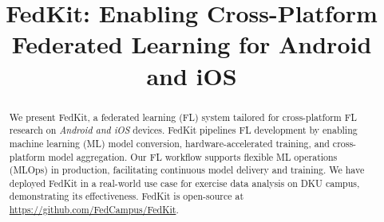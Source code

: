 \documentclass[conference]{IEEEtran}
\begin{document}

\newcommand*\circled[1]{\tikz[baseline=(char.base)]{
        \node[shape=circle,draw,inner sep=.6pt] (char) {#1};}}

\title{FedKit: Enabling Cross-Platform Federated Learning for Android and iOS\\
}

\author{
}

\maketitle

\begin{abstract}
    We present FedKit, a federated learning (FL) system tailored for
    cross-platform FL research on \textit{Android and iOS} devices.
    FedKit pipelines FL development by
    enabling machine learning (ML) model conversion,
    hardware-accelerated training,
    and cross-platform model aggregation.
    Our FL workflow supports flexible ML operations (MLOps) in production,
    facilitating continuous model delivery and training.
    We have deployed FedKit in a real-world use case for
    exercise data analysis on DKU campus,
    demonstrating its effectiveness.
    FedKit is open-source at \url{https://github.com/FedCampus/FedKit}.
\end{abstract}

\end{document}
